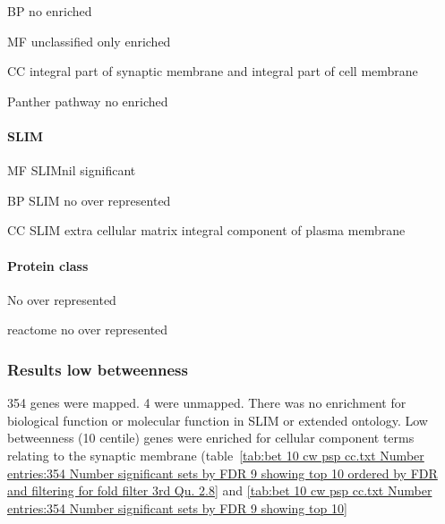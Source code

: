 BP no enriched

MF unclassified only enriched

CC integral part of synaptic membrane and integral part of cell membrane

Panther pathway no enriched
\paragraph{SLIM}
MF SLIMnil significant

BP SLIM no over represented

CC SLIM extra cellular matrix 
integral component of plasma membrane

\paragraph{Protein class}
No over represented

reactome no over represented


\subsubsection{Results low betweenness}

354 genes were mapped. 4 were unmapped. There was no enrichment for biological function or molecular function in SLIM or extended ontology. Low betweenness (10 centile) genes were enriched for cellular component terms relating to the synaptic membrane (table~\ref{tab:bet 10 cw psp cc.txt Number entries:354 Number significant sets by FDR 9 showing top 10 ordered by FDR and filtering for fold filter 3rd Qu. 2.8} and \ref{tab:bet 10 cw psp cc.txt Number entries:354 Number significant sets by FDR 9 showing top 10}



